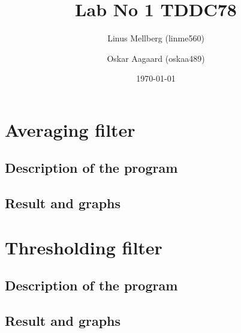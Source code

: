 \documentclass[a4paper,11pt]{article}
\begin{document}
\title{Lab No 1 TDDC78}
\author{Linus Mellberg (linme560) \and Oskar Aagaard (oskaa489)}
\date{\today}
\maketitle
\pagebreak
\thispagestyle{tcr}
\pagestyle{tcr}

\section{Averaging filter}
\subsection{Description of the program}
\subsection{Result and graphs}

\section{Thresholding filter}
\subsection{Description of the program}
\subsection{Result and graphs}
\end{document}
